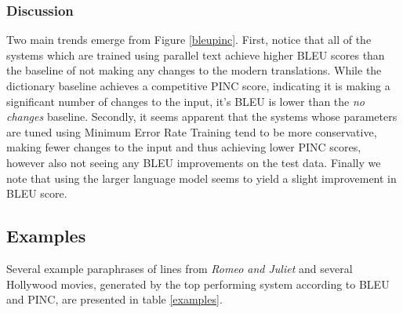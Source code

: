 \documentclass[10pt,a5paper,twoside]{article}
\begin{document}
\subsubsection{Discussion}
Two main trends emerge from Figure \ref{bleupinc}.  First, notice that all of the systems which are trained using parallel text achieve higher BLEU scores than the baseline
of not making any changes to the modern translations.  While the dictionary baseline achieves a competitive PINC score, indicating it is making a significant number of changes to the 
input, it's BLEU is lower than the \emph{no changes} baseline.  Secondly, it seems apparent that the systems whose parameters are tuned using Minimum Error Rate Training \cite{MERT}
tend to be more conservative, making fewer changes to the input and thus achieving lower PINC scores, however also not seeing any BLEU improvements on the test data.  Finally
we note that using the larger language model seems to yield a slight improvement in BLEU score.

\subsection{Examples}
Several example paraphrases of lines from {\em Romeo and Juliet} and several Hollywood movies, generated by the top performing system according to BLEU and PINC, are presented in table \ref{examples}.
\end{document}
